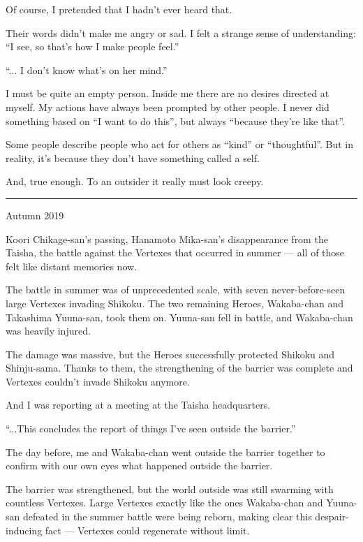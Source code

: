 Of course, I pretended that I hadn't ever heard that.

Their words didn't make me angry or sad. I felt a strange sense of understanding: ``I see, so that's how I make people feel.''

``... I don't know what's on her mind.''

I must be quite an empty person. Inside me there are no desires directed at myself. My actions have always been prompted by other people. I never did something based on ``I want to do this'', but always ``because they're like that''.

Some people describe people who act for others as ``kind'' or ``thoughtful''. But in reality, it's because they don't have something called a self.

And, true enough. To an outsider it really must look creepy.

\vspace{\baselineskip}
\hrule
\vspace{\baselineskip}

Autumn 2019

Koori Chikage-san's passing, Hanamoto Mika-san's disappearance from the Taisha, the battle against the Vertexes that occurred in summer --- all of those felt like distant memories now.

The battle in summer was of unprecedented scale, with seven never-before-seen large Vertexes invading Shikoku. The two remaining Heroes, Wakaba-chan and Takashima Yuuna-san, took them on. Yuuna-san fell in battle, and Wakaba-chan was heavily injured.

The damage was massive, but the Heroes successfully protected Shikoku and Shinju-sama. Thanks to them, the strengthening of the barrier was complete and Vertexes couldn't invade Shikoku anymore.

And I was reporting at a meeting at the Taisha headquarters.

``...This concludes the report of things I've seen outside the barrier.''

The day before, me and Wakaba-chan went outside the barrier together to confirm with our own eyes what happened outside the barrier.

The barrier was strengthened, but the world outside was still swarming with countless Vertexes. Large Vertexes exactly like the ones Wakaba-chan and Yuuna-san defeated in the summer battle were being reborn, making clear this despair-inducing fact --- Vertexes could regenerate without limit.

